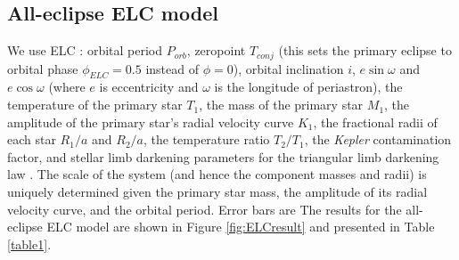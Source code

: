 \subsection{All-eclipse ELC model}
We use ELC : orbital period $P_{orb}$, zeropoint $T_{conj}$ (this sets the primary eclipse to orbital phase $\phi_{ELC} = 0.5$ instead of $\phi = 0$), orbital inclination $i$, $e \sin \omega$ and $e \cos \omega$ (where $e$ is eccentricity and $\omega$ is the longitude of periastron), the temperature of the primary star $T_1$, the mass of the primary star $M_1$, the amplitude of the primary star's radial velocity curve $K_1$, the fractional radii of each star $R_1/a$ and $R_2/a$, the temperature ratio $T_2/T_1$, the \emph{Kepler} contamination factor, and stellar limb darkening parameters for the triangular limb darkening law \citep{kip13}. The scale of the system (and hence the component masses and radii) is uniquely determined given the primary star mass, the amplitude of its radial velocity curve, and the orbital period. Error bars are  The results for the all-eclipse ELC model are shown in Figure \ref{fig:ELCresult} and presented in Table \ref{table1}.
